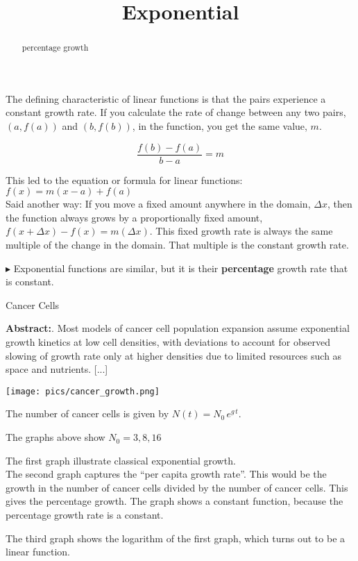 \documentclass{ximera}
\title{Exponential}
\begin{document}
\begin{abstract}
percentage growth
\end{abstract}
\maketitle




The defining characteristic of linear functions is that the pairs experience a constant growth rate. If you calculate the rate of change between any two pairs, $(a, f(a))$ and $(b, f(b))$, in the function, you get the same value, $m$.


\[   \frac{f(b)-f(a)}{b-a} = m       \]

This led to the equation or formula for linear functions:  $f(x) = m(x-a) + f(a)$ \\


Said another way:  If you move a fixed amount anywhere in the domain, $\Delta x$, then the function always grows by a proportionally fixed amount, $f(x + \Delta x) - f(x) = m(\Delta x)$. This fixed growth rate is always the same multiple of the change in the domain. That multiple is the constant growth rate.


$\blacktriangleright$ Exponential functions are similar, but it is their \textbf{percentage} growth rate that is constant.   \\


\begin{example} Cancer Cells 


\textbf{Abstract:}. Most models of cancer cell population expansion assume exponential growth kinetics at low cell densities, with deviations to account for observed slowing of growth rate only at higher densities due to limited resources such as space and nutrients. [...] \\


\begin{image}
\texttt{[image: pics/cancer\_growth.png]}
\end{image}


The number of cancer cells is given by $N(t) = N_0 \, e^{g \, t}$.

The graphs above show $N_0 = 3, 8, 16$

The first graph illustrate classical exponential growth.  \\

The second graph captures the ``per capita growth rate''.  This would be the growth in the number of cancer cells divided by the number of cancer cells. This gives the percentage growth.  The graph shows a constant function, because the percentage growth rate is a constant.

The third graph shows the logarithm of the first graph, which turns out to be a linear function.



\end{example}
\end{document}
